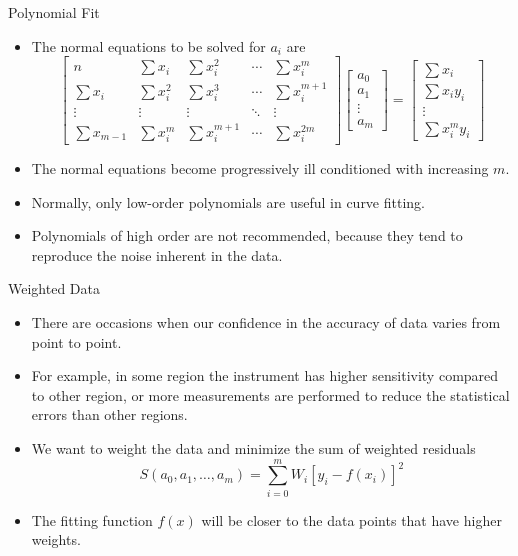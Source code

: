 \documentclass{beamer}
\newcommand{\beforeverb}{\footnotesize}
\newcommand{\afterverb}{\normalsize}
\begin{document}
\begin{frame}{Polynomial Fit}
\begin{itemize}
\item The normal equations to be solved for $a_i$ are 
\beforeverb
\[
\left[
\begin{array}{lllll}
n & \sum x_i & \sum x_i^2 & \cdots & \sum x_i^m \\
\sum x_i & \sum x_i^2 &  \sum x_i^3& \cdots  & \sum x_i^{m+1}\\
\vdots & \vdots & \vdots & \ddots &\vdots \\
\sum x_{m-1} & \sum x_i^m  & \sum x_i^{m+1} & \cdots & \sum x_i^{2m}
\end{array}
\right] \left[
\begin{array}{l}
a_0 \\
a_1 \\
\vdots\\
a_m
\end{array}
\right]
=\left[
\begin{array}{l}
\sum x_i \\
\sum x_i y_i \\
\vdots\\
\sum x_i^m y_i
\end{array}
\right]
\]
\afterverb
\item The normal equations become progressively ill conditioned with increasing $m$. 
\item Normally, only \alert{ low-order polynomials} are useful in curve fitting. 
\item Polynomials of high order are not recommended, because they tend to reproduce the noise inherent in the data.
\end{itemize}
\end{frame}
\begin{frame}{Weighted  Data}
\begin{itemize}
\item There are occasions when our confidence in the accuracy of data varies from point to point.
\item For example, in some region the instrument has higher sensitivity compared to other region, or more measurements are performed to reduce the statistical errors than other regions. 
\item We want to \alert{weight} the data and minimize the sum of \alert{weighted residuals}
\[
S(a_0,a_1, \ldots,a_m)=\sum_{i=0}^mW_i [y_i-f(x_i)]^2
\]
\item The fitting function $f(x)$ will be  closer to the data points that have higher weights.
\end{itemize}
\end{frame}
\end{document}
